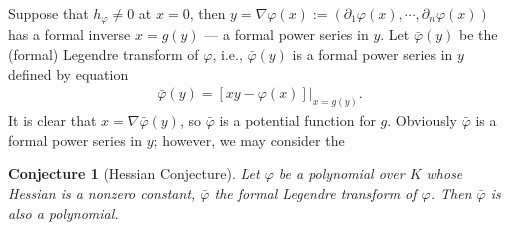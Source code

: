 \documentclass{article}
\newtheorem{conjecture}[defn]{Conjecture}
\newtheorem{main theorem}[defn]{Main Theorem}
\begin{document}
Suppose that $h_\varphi\neq 0$ at $x=0$, then
$y=\nabla\varphi(x):=(\partial_1
\varphi(x),\cdots,\partial_n\varphi(x))$ has a formal inverse
$x=g(y)$ --- a formal power series in $y$. Let $\bar \varphi(y)$
be the (formal) Legendre transform of $\varphi$, i.e., $\bar
\varphi(y)$ is a formal power series in $y$ defined by
equation
\begin{eqnarray}\label{LT}
\bar\varphi(y)=[xy-\varphi(x)]|_{x=g(y)}.
\end{eqnarray}
It is clear that $x=\nabla\bar\varphi(y)$, so $\bar\varphi$ is a
potential function for $g$. Obviously $\bar\varphi$ is a formal
power series in $y$; however, we may consider the


\begin{conjecture}[Hessian Conjecture]\label{HC} Let $\varphi$ be a polynomial
over $K$ whose
Hessian is a nonzero constant, $\bar\varphi$ the formal Legendre
transform of $\varphi$. Then $\bar\varphi$ is also a polynomial.
\end{conjecture}
\end{document}
